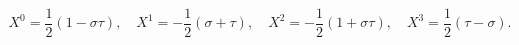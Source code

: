 \begin{equation}X^0=\frac 1 2 (1-\sigma\tau), \quad X^1=-\frac 1 2
(\sigma+\tau),\quad X^2=-\frac 1 2 (1+\sigma\tau), \quad X^3=\frac
1 2 (\tau-\sigma).\label{ixlambda}\end{equation}

